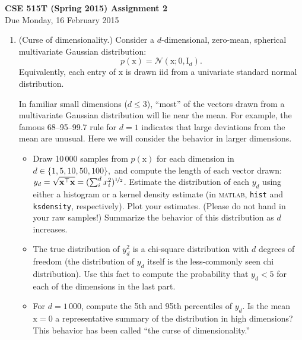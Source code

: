 \documentclass{article}
\newcommand{\acro}[1]{\textsc{\MakeLowercase{#1}}}
\newcommand{\mc}[1]{\mathcal{#1}}
\newcommand{\mat}[1]{\bm{\mathrm{#1}}}
\renewcommand{\vec}[1]{\bm{\mathrm{#1}}}
\newcommand{\trans}{^\top}
\begin{document}
{\large \textbf{CSE 515T (Spring 2015) Assignment 2}} \\
Due Monday, 16 February 2015 \\

\begin{enumerate}

\item
  (Curse of dimensionality.)
  Consider a $d$-dimensional, zero-mean, spherical multivariate
  Gaussian distribution:
  \begin{equation*}
    p(\vec{x}) = \mc{N}(\vec{x}; \vec{0}, \mat{I}_d).
  \end{equation*}
  Equivalently, each entry of $\vec{x}$ is drawn iid from a univariate
  standard normal distribution.

  In familiar small dimensions ($d \leq 3$), ``most'' of the vectors
  drawn from a multivariate Gaussian distribution will lie near the
  mean.  For example, the famous 68--95--99.7 rule for $d = 1$
  indicates that large deviations from the mean are unusual.  Here we
  will consider the behavior in larger dimensions.
  \begin{itemize}
  \item Draw 10\,000 samples from $p(\vec{x})$ for each dimension in
    $d \in \{1, 5, 10, 50, 100\},$ and compute the length of each
    vector drawn: $y_d = \sqrt{\vec{x}\trans \vec{x}} = (\sum_i^d
    x_i^2)^{\nicefrac{1}{2}}$.  Estimate the distribution of each
    $y_d$ using either a histogram or a kernel density estimate (in
    \acro{MATLAB}, \texttt{hist} and \texttt{ksdensity},
    respectively).  Plot your estimates.  (Please do not hand in your
    raw samples!)  Summarize the behavior of this distribution as $d$
    increases.
  \item
    The true distribution of $y_d^2$ is a chi-square distribution with
    $d$ degrees of freedom (the distribution of $y_d$ itself is the
    less-commonly seen chi distribution).  Use this fact to compute
    the probability that $y_d < 5$ for each of the dimensions in the
    last part.
  \item
    For $d = 1\,000$, compute the 5th and 95th percentiles of $y_d$.
    Is the mean $\vec{x} = \vec{0}$ a representative summary of the
    distribution in high dimensions?  This behavior has been called
    ``the curse of dimensionality.''
  \end{itemize}


\end{enumerate}
\end{document}
